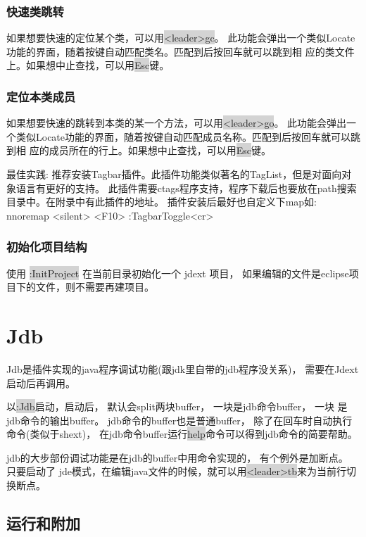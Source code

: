 \documentclass[oneside,openany]{book}
\begin{document}
\subsubsection{快速类跳转}
  如果想要快速的定位某个类，可以用\colorbox{lightgray}{<leader>gc}。
此功能会弹出一个类似Locate功能的界面，随着按键自动匹配类名。匹配到后按回车就可以跳到相
应的类文件上。如果想中止查找，可以用\colorbox{lightgray}{Esc}键。

\subsubsection{定位本类成员}
  如果想要快速的跳转到本类的某一个方法，可以用\colorbox{lightgray}{<leader>go}。
  此功能会弹出一个类似Locate功能的界面，随着按键自动匹配成员名称。匹配到后按回车就可以跳到相
  应的成员所在的行上。如果想中止查找，可以用\colorbox{lightgray}{Esc}键。
  \begin{mdframed}[style=BestPracticeFrame]
    最佳实践: 推荐安装Tagbar插件。此插件功能类似著名的TagList，但是对面向对象语言有更好的支持。
    此插件需要ctags程序支持，程序下载后也要放在path搜索目录中。在附录中有此插件的地址。
    插件安装后最好也自定义下map如:
      nnoremap <silent> <F10> :TagbarToggle<cr>
  \end{mdframed}

\subsubsection{初始化项目结构}
使用 \colorbox{lightgray}{:InitProject} 在当前目录初始化一个 jdext 项目， 如果编辑的文件是eclipse项目下的文件，则不需要再建项目。 

\section{Jdb}
    Jdb是插件实现的java程序调试功能(跟jdk里自带的jdb程序没关系)， 需要在Jdext启动后再调用。

    以\colorbox{lightgray}{:Jdb}启动，启动后， 默认会split两块buffer， 一块是jdb命令buffer， 一块
是jdb命令的输出buffer。 jdb命令的buffer也是普通buffer， 除了在回车时自动执行命令(类似于shext)，
在jdb命令buffer运行\colorbox{lightgray}{help}命令可以得到jdb命令的简要帮助。

    jdb的大步部份调试功能是在jdb的buffer中用命令实现的， 有个例外是加断点。 只要启动了
    jde模式，在编辑java文件的时候，就可以用\colorbox{lightgray}{<leader>tb}来为当前行切换断点。

  \subsection{运行和附加}
    
\end{document}
